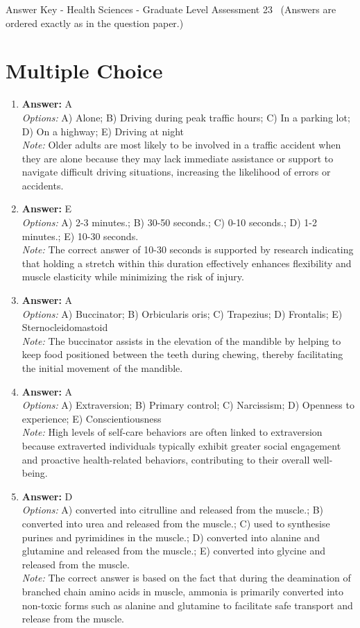 \documentclass[12pt]{article}
\begin{document}
\begin{center}
Answer Key - Health Sciences - Graduate Level Assessment 23 \
\small (Answers are ordered exactly as in the question paper.)
\end{center}

\section*{Multiple Choice}
\begin{enumerate}[label=\arabic*.]
\item \textbf{Answer:} A
\\ \textit{Options:} A) Alone; B) Driving during peak traffic hours; C) In a parking lot; D) On a highway; E) Driving at night
\\ \textit{Note:} Older adults are most likely to be involved in a traffic accident when they are alone because they may lack immediate assistance or support to navigate difficult driving situations, increasing the likelihood of errors or accidents.
\item \textbf{Answer:} E
\\ \textit{Options:} A) 2-3 minutes.; B) 30-50 seconds.; C) 0-10 seconds.; D) 1-2 minutes.; E) 10-30 seconds.
\\ \textit{Note:} The correct answer of 10-30 seconds is supported by research indicating that holding a stretch within this duration effectively enhances flexibility and muscle elasticity while minimizing the risk of injury.
\item \textbf{Answer:} A
\\ \textit{Options:} A) Buccinator; B) Orbicularis oris; C) Trapezius; D) Frontalis; E) Sternocleidomastoid
\\ \textit{Note:} The buccinator assists in the elevation of the mandible by helping to keep food positioned between the teeth during chewing, thereby facilitating the initial movement of the mandible.
\item \textbf{Answer:} A
\\ \textit{Options:} A) Extraversion; B) Primary control; C) Narcissism; D) Openness to experience; E) Conscientiousness
\\ \textit{Note:} High levels of self-care behaviors are often linked to extraversion because extraverted individuals typically exhibit greater social engagement and proactive health-related behaviors, contributing to their overall well-being.
\item \textbf{Answer:} D
\\ \textit{Options:} A) converted into citrulline and released from the muscle.; B) converted into urea and released from the muscle.; C) used to synthesise purines and pyrimidines in the muscle.; D) converted into alanine and glutamine and released from the muscle.; E) converted into glycine and released from the muscle.
\\ \textit{Note:} The correct answer is based on the fact that during the deamination of branched chain amino acids in muscle, ammonia is primarily converted into non-toxic forms such as alanine and glutamine to facilitate safe transport and release from the muscle.
\end{enumerate}
\end{document}
